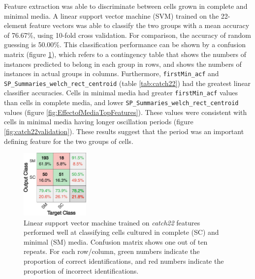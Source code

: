 Feature extraction was able to discriminate between cells grown in complete and minimal media.
A linear support vector machine (SVM) trained on the 22-element feature vectors was able to classify the two groups with a mean accuracy of 76.67\%, using 10-fold cross validation.
For comparison, the accuracy of random guessing is 50.00\%.
This classification performance can be shown by a confusion matrix (figure \ref{fig:EffectofMediaCM}), which refers to a contingency table that shows the numbers of instances predicted to belong in each group in rows, and shows the numbers of instances in actual groups in columns.
Furthermore, \texttt{first\-Min\_\-acf} and \texttt{SP\_\-Sum\-ma\-ries\_\-welch\_\-rect\_\-cen\-troid} (table \ref{tab:catch22}) had the greatest linear classifier accuracies.
Cells in minimal media had greater \texttt{first\-Min\_\-acf} values than cells in complete media, and lower \texttt{SP\_\-Sum\-ma\-ries\_\-welch\_\-rect\_\-cen\-troid} values (figure \ref{fig:EffectofMediaTopFeatures}).
These values were consistent with cells in minimal media having longer oscillation periods (figure \ref{fig:catch22validation}).
These results suggest that the period was an important defining feature for the two groups of cells.

\begin{figure}[htbp]
  \centering
  \includegraphics[width=0.3\textwidth]{10m_EffectofMediaCM}
  \caption{Linear support vector machine trained on \emph{catch22} features performed well at classifying cells cultured in complete (SC) and minimal (SM) media.
    Confusion matrix shows one out of ten repeats.
    For each row/column, green numbers indicate the proportion of correct identifications, and red numbers indicate the proportion of incorrect identifications.}
  \label{fig:EffectofMediaCM}
\end{figure}

